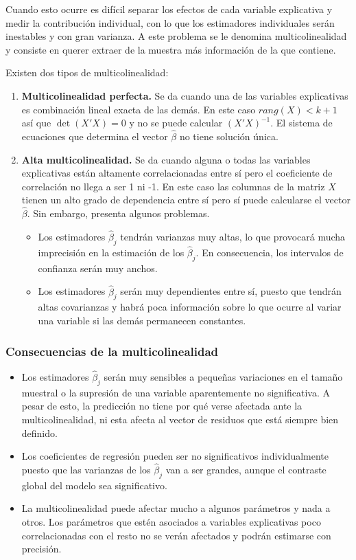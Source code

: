 Cuando esto ocurre es difícil separar los efectos de cada variable explicativa y medir la contribución individual, con lo que los estimadores individuales serán inestables y con gran varianza.
A este problema se le denomina multicolinealidad y consiste en querer extraer de la muestra más información de la que contiene.

Existen dos tipos de multicolinealidad:
\begin{enumerate}
    \item \textbf{Multicolinealidad perfecta.}
          Se da cuando una de las variables explicativas es combinación lineal exacta de las demás.
          En este caso $rang(X) < k+1$ así que $\det(X'X) = 0$ y no se puede calcular $(X'X)^{-1}$.
          El sistema de ecuaciones que determina el vector $\hat{\beta}$ no tiene solución única.
    \item \textbf{Alta multicolinealidad.}
          Se da cuando alguna o todas las variables explicativas están altamente correlacionadas entre sí pero el coeficiente de correlación no llega a ser 1 ni -1.
          En este caso las columnas de la matriz $X$ tienen un alto grado de dependencia entre sí pero sí puede calcularse el vector $\hat{\beta}$.
          Sin embargo, presenta algunos problemas.
          \begin{itemize}
              \item Los estimadores $\hat{\beta}_j$ tendrán varianzas muy altas, lo que provocará mucha imprecisión en la estimación de los $\hat{\beta}_j$.
                    En consecuencia, los intervalos de confianza serán muy anchos.
              \item Los estimadores $\hat{\beta}_j$ serán muy dependientes entre sí, puesto que tendrán altas covarianzas y habrá poca información sobre lo que ocurre al variar una variable si las demás permanecen constantes.
          \end{itemize}
\end{enumerate}

\subsubsection*{Consecuencias de la multicolinealidad}
\begin{itemize}
    \item Los estimadores $\hat{\beta}_j$ serán muy sensibles a pequeñas variaciones en el tamaño muestral o la supresión de una variable aparentemente no significativa.
          A pesar de esto, la predicción no tiene por qué verse afectada ante la multicolinealidad, ni esta afecta al vector de residuos que está siempre bien definido.
    \item Los coeficientes de regresión pueden ser no significativos individualmente puesto que las varianzas de los $\hat{\beta}_j$ van a ser grandes, aunque el contraste global del modelo sea significativo.
    \item La multicolinealidad puede afectar mucho a algunos parámetros y nada a otros.
          Los parámetros que estén asociados a variables explicativas poco correlacionadas con el resto no se verán afectados y podrán estimarse con precisión.
\end{itemize}

